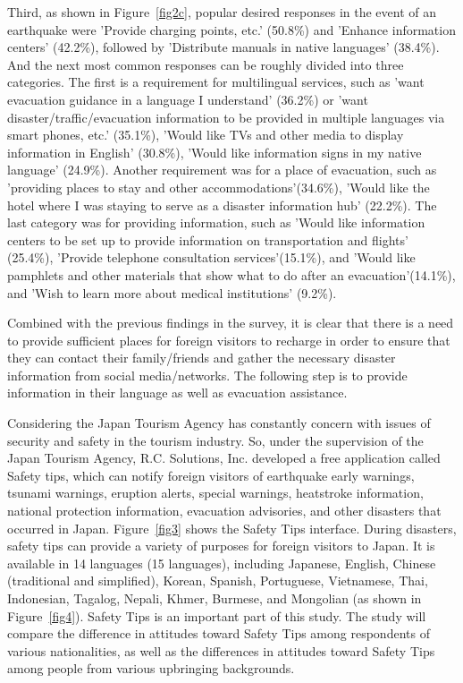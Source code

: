 Third, as shown in Figure~\ref{fig2c}, popular desired responses in the event of an earthquake were 'Provide charging points, etc.' (50.8\%) and 'Enhance information centers' (42.2\%), followed by 'Distribute manuals in native languages' (38.4\%). And the next most common responses can be roughly divided into three categories. The first is a requirement for multilingual services, such as 'want evacuation guidance in a language I understand' (36.2\%) or 'want disaster/traffic/evacuation information to be provided in multiple languages via smart phones, etc.' (35.1\%), 'Would like TVs and other media to display information in English' (30.8\%), 'Would like information signs in my native language' (24.9\%). Another requirement was for a place of evacuation, such as 'providing places to stay and other accommodations'(34.6\%), 'Would like the hotel where I was staying to serve as a disaster information hub' (22.2\%). The last category was for providing information, such as 'Would like information centers to be set up to provide information on transportation and flights' (25.4\%), 'Provide telephone consultation services'(15.1\%), and 'Would like pamphlets and other materials that show what to do after an evacuation'(14.1\%), and 'Wish to learn more about medical institutions' (9.2\%).

Combined with the previous findings in the survey, it is clear that there is a need to provide sufficient places for foreign visitors to recharge in order to ensure that they can contact their family/friends and gather the necessary disaster information from social media/networks. The following step is to provide information in their language as well as evacuation assistance.

Considering the Japan Tourism Agency has constantly concern with issues of security and safety in the tourism industry. So, under the supervision of the Japan Tourism Agency, R.C. Solutions, Inc. developed a free application called Safety tips, which can notify foreign visitors of earthquake early warnings, tsunami warnings, eruption alerts, special warnings, heatstroke information, national protection information, evacuation advisories, and other disasters that occurred in Japan. Figure~\ref{fig3} shows the Safety Tips interface. During disasters, safety tips can provide a variety of purposes for foreign visitors to Japan. It is available in 14 languages (15 languages), including Japanese, English, Chinese (traditional and simplified), Korean, Spanish, Portuguese, Vietnamese, Thai, Indonesian, Tagalog, Nepali, Khmer, Burmese, and Mongolian (as shown in Figure~\ref{fig4}). Safety Tips is an important part of this study. The study will compare the difference in attitudes toward Safety Tips among respondents of various nationalities, as well as the differences in attitudes toward Safety Tips among people from various upbringing backgrounds.

